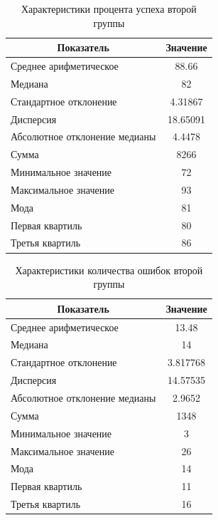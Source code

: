 \begin{table}[H]
	\centering
	\caption{Характеристики процента успеха второй группы}
	\begin{tabular}{|l|c|}
		\hline
		\multicolumn{1}{|c|}{\textbf{Показатель}} & \textbf{Значение}\\ \hline
		Среднее арифметическое        & 88.66    \\ \hline
		Медиана                       & 82       \\ \hline
		Стандартное отклонение        & 4.31867  \\ \hline
		Дисперсия                      & 18.65091 \\ \hline
		Абсолютное отклонение медианы & 4.4478   \\ \hline
		Сумма                         & 8266     \\ \hline
		Минимальное значение          & 72       \\ \hline
		Максимальное значение         & 93       \\ \hline
		Мода & 81 \\ \hline
		Первая квартиль & 80 \\ \hline
		Третья квартиль & 86 \\ \hline
	\end{tabular}
\end{table}


\begin{table}[H]
	\centering
	\caption{Характеристики количества ошибок второй группы}
	\begin{tabular}{|l|c|}
		\hline
		\multicolumn{1}{|c|}{\textbf{Показатель}} & \textbf{Значение}\\ \hline
		Среднее арифметическое        & 13.48    \\ \hline
		Медиана                       & 14       \\ \hline
		Стандартное отклонение        & 3.817768 \\ \hline
		Дисперсия                      & 14.57535 \\ \hline
		Абсолютное отклонение медианы & 2.9652   \\ \hline
		Сумма                         & 1348     \\ \hline
		Минимальное значение          & 3        \\ \hline
		Максимальное значение         & 26       \\ \hline
		Мода & 14 \\ \hline
		Первая квартиль & 11 \\ \hline
		Третья квартиль & 16 \\ \hline
	\end{tabular}
\end{table}


